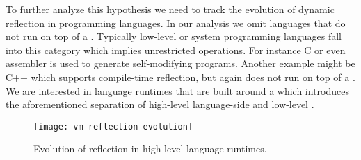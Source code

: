 To further analyze this hypothesis we need to track the evolution of dynamic reflection in programming languages.
In our analysis we omit languages that do not run on top of a \VM.
Typically low-level or system programming languages fall into this category which implies unrestricted operations.
For instance C or even assembler is used to generate self-modifying programs.
Another example might be C++ which supports compile-time reflection, but again does not run on top of a \VM. 
We are interested in language runtimes that are built around a \VM which introduces the aforementioned separation of high-level language-side and low-level \VM.
%
\begin{figure}[h]
	\centering
	\texttt{[image: vm-reflection-evolution]}
	\caption[High-level Language Reflection Evolution]{Evolution of reflection in high-level language runtimes.}
\end{figure}

